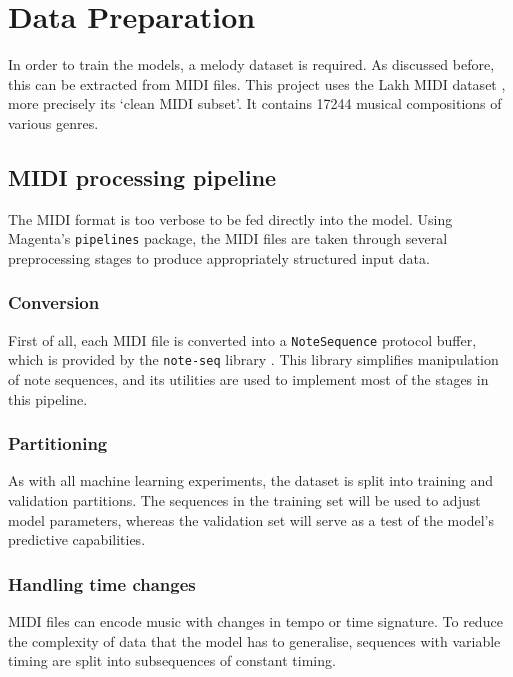 \documentclass[../../report.tex]{subfiles}
\begin{document}
\section{Data Preparation}

In order to train the models, a melody dataset is required. As discussed before,
this can be extracted from MIDI files. This project uses the Lakh MIDI dataset
\cite{Raffel2016}, more precisely its `clean MIDI subset'. It contains
\num{17244} musical compositions of various genres.

\subsection{MIDI processing pipeline}

The MIDI format is too verbose to be fed directly into the model. Using
Magenta's \texttt{pipelines} package, the MIDI files are taken through several
preprocessing stages to produce appropriately structured input data.

\subsubsection{Conversion}

First of all, each MIDI file is converted into a \texttt{NoteSequence} protocol
buffer\footnotemark{}, which is provided by the \texttt{note-seq} library
\cite{NoteSeq}. This library simplifies manipulation of note sequences, and its
utilities are used to implement most of the stages in this pipeline.


\subsubsection{Partitioning}

As with all machine learning experiments, the dataset is split into training and
validation partitions. The sequences in the training set will be used to adjust
model parameters, whereas the validation set will serve as a test of the model's
predictive capabilities.

\subsubsection{Handling time changes}

MIDI files can encode music with changes in tempo or time signature. To reduce
the complexity of data that the model has to generalise, sequences with variable
timing are split into subsequences of constant timing.
\end{document}
